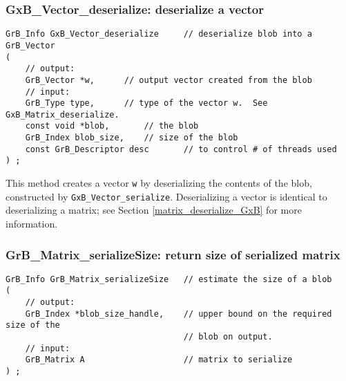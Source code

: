 \documentclass[12pt]{article}
\begin{document}
{%
\subsubsection{{\sf GxB\_Vector\_deserialize:}    deserialize a vector}
\label{vector_deserialize_GxB}

\begin{mdframed}[userdefinedwidth=6in]
{\footnotesize
\begin{verbatim}
GrB_Info GxB_Vector_deserialize     // deserialize blob into a GrB_Vector
(
    // output:
    GrB_Vector *w,      // output vector created from the blob
    // input:
    GrB_Type type,      // type of the vector w.  See GxB_Matrix_deserialize.
    const void *blob,       // the blob
    GrB_Index blob_size,    // size of the blob
    const GrB_Descriptor desc       // to control # of threads used
) ;
\end{verbatim}
} \end{mdframed}

This method creates a vector \verb'w' by deserializing the contents of the
blob, constructed by
\verb'GxB_Vector_serialize'.
Deserializing a vector is identical to deserializing a matrix;
see Section \ref{matrix_deserialize_GxB} for more information.


\subsubsection{{\sf GrB\_Matrix\_serializeSize:}  return size of serialized matrix}
\label{matrix_serialize_size}

\begin{mdframed}[userdefinedwidth=6in]
{\footnotesize
\begin{verbatim}
GrB_Info GrB_Matrix_serializeSize   // estimate the size of a blob
(
    // output:
    GrB_Index *blob_size_handle,    // upper bound on the required size of the
                                    // blob on output.
    // input:
    GrB_Matrix A                    // matrix to serialize
) ;
\end{verbatim}
} \end{mdframed}

}
\end{document}
